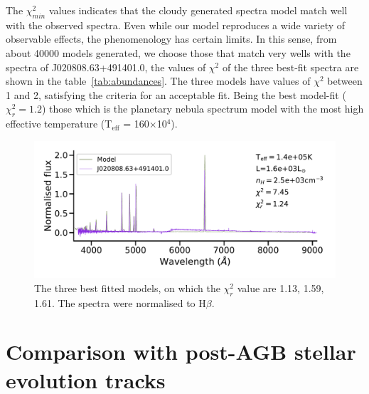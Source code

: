 \documentclass[fleqn,usenatbib]{mnras}
\begin{document}
The $\chi^{2}_{min}$ values indicates that the {\sc cloudy} generated
spectra model match well with the observed spectra. Even while our model reproduces
a wide variety of observable effects, the phenomenology has certain limits.
In this sense, from about 40000 models generated, we choose those that
match very wells with the spectra of J020808.63+491401.0,
the values of $\chi^{2}$ of the three best-fit spectra
are shown in the table~\ref{tab:abundances}. The three
models have values of $\chi^{2}$ between 1 and 2, satisfying
the criteria for an acceptable fit. Being the best model-fit ($\chi^{2}_{r} = 1.2$)
those which is the  planetary nebula spectrum model with the
most high effective temperature (T$_{\text{eff}}$ = 160$\times$10$^{4}$).

\begin{figure}
\centering
\includegraphics[width=\linewidth, trim=10 90 10 10, clip]{Figs/model_140000_36.79_3.40.pdf}
\caption{The three best fitted models, on which the $\chi^2_r$ value are 1.13, 1.59, 1.61.
  The spectra were normalised to H{$\beta$}.} 
  \label{fig:spectra-obs-model}
\end{figure}

\section{Comparison with post-AGB stellar evolution tracks}
\label{sec:tracks}
\end{document}
